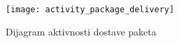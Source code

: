 	
\begin{figure}[H]
	\begin{center}
		\texttt{[image: activity\_package\_delivery]}
	\end{center}
	\caption{Dijagram aktivnosti dostave paketa}
\end{figure}	
